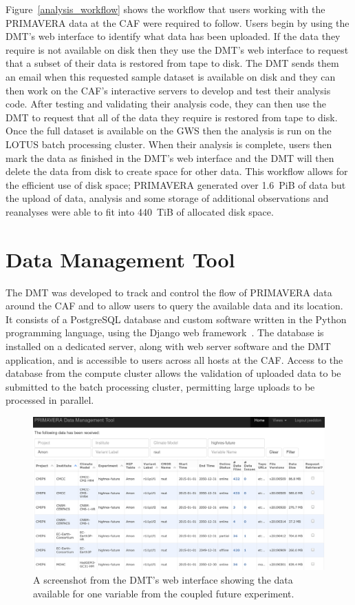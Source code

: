 \documentclass[gmd, manuscript]{copernicus}
\begin{document}
Figure~\ref{analysis_workflow} shows the workflow that users working with the PRIMAVERA data at the CAF were required to follow. Users begin by using the DMT's web interface to identify what data has been uploaded. If the data they require is not available on disk then they use the DMT's web interface to request that a subset of their data is restored from tape to disk. The DMT sends them an email when this requested sample dataset is available on disk and they can then work on the CAF's interactive servers to develop and test their analysis code. After testing and validating their analysis code, they can then use the DMT to request that all of the data they require is restored from tape to disk. Once the full dataset is available on the GWS then the analysis is run on the LOTUS batch processing cluster. When their analysis is complete, users then mark the data as finished in the DMT's web interface and the DMT will then delete the data from disk to create space for other data. This workflow allows for the efficient use of disk space; PRIMAVERA generated over 1.6~PiB of data but the upload of data, analysis and some storage of additional observations and reanalyses were able to fit into 440~TiB of allocated disk space.

\section{Data Management Tool}

The DMT was developed to track and control the flow of PRIMAVERA data around the CAF and to allow users to query the available data and its location. It consists of a PostgreSQL database and custom software written in the Python programming language, using the Django web framework~\citep{Django}. The database is installed on a dedicated server, along with web server software and the DMT application, and is accessible to users across all hosts at the CAF. Access to the database from the compute cluster allows the validation of uploaded data to be submitted to the batch processing cluster, permitting large uploads to be processed in parallel.

\begin{figure}[t]
	\includegraphics[width=12cm]{fig03.png}
	\caption{A screenshot from the DMT's web interface showing the data available for one variable from the coupled future experiment.}
	\label{dmt_query}
\end{figure}
\end{document}
